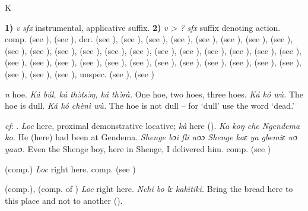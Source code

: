 \begin{letter}{K}

 \textbf{1)} \textit{v} \textit{sfx} instrumental, applicative suffix. \textbf{2)} \textit{v > ?} \textit{sfx} suffix denoting action. comp.  (see ),  (see ), der.  (see ),  (see ),  (see ),  (see ),  (see ),  (see ),  (see ),  (see ),  (see ),  (see ),  (see ),  (see ),  (see ),  (see ),  (see ),  (see ),  (see ),  (see ),  (see ),  (see ),  (see ),  (see ),  (see ),  (see ),  (see ),  (see ),  (see ),  (see ),  (see ),  (see ),  (see ),  (see ),  (see ),  (see ),  (see ), unspec.  (see ),  (see ) 

 \textit{n} hoe. \textit{Ká búl, ká thə̀tsə̀ŋ, ká thə̀rà.} One hoe, two hoes, three hoes. \textit{Ká kó wù.} The hoe is dull. \textit{Ká kó chènì wù.} The hoe is not dull – for ‘dull' use the word ‘dead.'

 \textit{cf}: . \textit{Loc} here, proximal demonstrative locative; \textit{kà} here (\citealt{Sumner1921}). \textit{Ka koŋ che Ngendema ko.} He (here) had been at Gendema. \textit{Shenge bɔi fli wɔɔ Shenge kaɛ ya gbemiɛ wɔ yawɔ.} Even the Shenge boy, here in Shenge, I delivered him. comp.  (see ) 

 (comp.) \textit{Loc} right here. comp.  (see )

 (comp.), (comp. of ) \textit{Loc} right here. \textit{Nchi bo lɛ kakitiki.} Bring the bread here to this place and not to another (\citealt{Pichl1967}). 


\end{letter}

